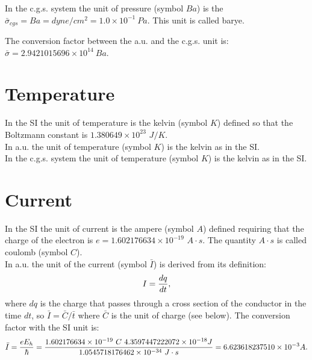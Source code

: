 \documentclass[12pt,a4paper]{article}
\def\hbarf{1.0545718176462\times 10^{-34}}
\def\e{1.602176634\times 10^{-19}}
\def\baru{4.3597447222072\times 10^{-18}}
\def\bari{6.623618237510\times 10^{-3}}
\def\barc{1.602176634\times 10^{-19}}
\def\prtopr{1.0\times 10^{-1}}
\def\barprcgs{2.9421015696\times 10^{14}}
\begin{document}
{\color{orange} In the c.g.s. system the unit of pressure (symbol $Ba$)
is the $\bar \sigma_{cgs}=Ba=dyne/cm^2 = \prtopr\ Pa$. This unit is 
called barye. 
\\
}

{\color{green} The conversion factor between the a.u. and the c.g.s. unit is:
$\bar \sigma=\barprcgs\ Ba$.
}


\newpage
\section{\color{coral}Temperature}
In the SI the unit of temperature is the kelvin (symbol $K$) defined
so that the Boltzmann constant is $1.380649\times 10^{23}$ $J / K$.
\\

{\color{web-blue} In a.u. the unit of temperature (symbol $K$) is the 
kelvin as in the SI.}
\\

{\color{orange} In the c.g.s. system the unit of temperature (symbol $K$) 
is the kelvin as in the SI.}

\newpage
\section{\color{coral}Current}
In the SI the unit of current is the ampere (symbol $A$) defined
requiring that the charge of the electron is $e=\e$ $A\cdot s$.
The quantity $A\cdot s$ is called coulomb (symbol $C$).
\\

{\color{web-blue} In a.u. the unit of the current (symbol $\bar I$) is  
derived from its definition:
\begin{equation}
I={dq \over dt}, 
\end{equation}
where $dq$ is the charge that passes through a cross section of the conductor
in the time $dt$, so $\bar I = \bar C / \bar t$ where $\bar C$ is the 
unit of charge (see below). The conversion factor with the SI unit is:
\begin{equation}
\bar I = {e E_h \over \hbar}={\barc\ C\ \baru J \over 
\hbarf\  J\cdot s} = \bari A.
\end{equation}
}
\\
\end{document}
